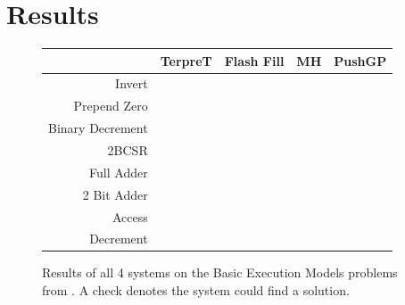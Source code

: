 \section{Results}

\begin{figure}
\begin{tabular}{ r | c c c c }
	& TerpreT & Flash Fill & MH & PushGP \\
	\hline
	Invert & \checkmark &  & \checkmark & \checkmark \\
	Prepend Zero & \checkmark & \checkmark & \checkmark & \checkmark \\
	Binary Decrement & \checkmark &  &  &  \\
	2BCSR & \checkmark &  &  & \checkmark \\
	Full Adder & \checkmark &  &  & \checkmark \\
	2 Bit Adder & \checkmark &  &  &  \\
	Access & \checkmark &  & \checkmark & \checkmark \\
	Decrement & \checkmark &  & \checkmark & \checkmark \\
\end{tabular}
\caption{Results of all 4 systems on the Basic Execution Models problems from \cite{Gaunt2016}. A check denotes the system could find a solution.}
\label{fig:results1}
\end{figure}

